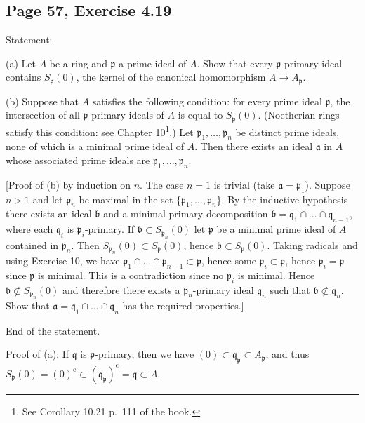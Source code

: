 \documentclass[parskip=half,fontsize=12pt]{scrartcl}%
\newcommand{\oo}{\operatorname}\newcommand{\ooo}{\operatorname*}
\newcommand{\mf}{\mathfrak}
\newcommand{\ppp}{\mf p}
\newcommand{\qqq}{\mf q}
\begin{document}
\subsection{Page 57, Exercise 4.19}%

Statement:

(a) Let $A$ be a ring and $\mathfrak p$ a prime ideal of $A$. Show that every $\mathfrak p$-primary ideal contains $S_{\mathfrak p}(0)$, the kernel of the canonical homomorphism $A\to A_{\mathfrak p}$.

(b) Suppose that $A$ satisfies the following condition: for every prime ideal $\mathfrak p$, the intersection of all $\mathfrak p$-primary ideals of $A$ is equal to $S_{\mathfrak p}(0)$. (Noetherian rings satisfy this condition: see Chapter 10\footnote{See Corollary 10.21 p.~111 of the book.}.) Let $\mathfrak p_1,\dots,\mathfrak p_n$ be distinct prime ideals, none of which is a minimal prime ideal of $A$. Then there exists an ideal $\mathfrak a$ in $A$ whose associated prime ideals are $\mathfrak p_1,\dots,\mathfrak p_n$.

[Proof of (b) by induction on $n$. The case $n=1$ is trivial (take $\mathfrak a=\mathfrak p_1$). Suppose $n>1$ and let $\mathfrak p_n$ be maximal in the set $\{\mathfrak p_1,\dots,\mathfrak p_n\}$. By the inductive hypothesis there exists an ideal $\mathfrak b$ and a minimal primary decomposition $\mathfrak b=\mathfrak q_1\cap\dots\cap\mathfrak q_{n-1}$, where each $\mathfrak q_i$ is $\mathfrak p_i$-primary. If $\mathfrak b\subset S_{\mathfrak p_n}(0)$ let $\mathfrak p$ be a minimal prime ideal of $A$ contained in $\mathfrak p_n$. Then $S_{\mathfrak p_n}(0)\subset S_{\mathfrak p}(0)$, hence $\mathfrak b\subset S_{\mathfrak p}(0)$. Taking radicals and using Exercise 10, we have $\mathfrak p_1\cap\dots\cap\mathfrak p_{n-1}\subset\mathfrak p$, hence some $\mathfrak p_i\subset \mathfrak p$, hence $\mathfrak p_i=\mathfrak p$ since $\mathfrak p$ is minimal. This is a contradiction since no $\mathfrak p_i$ is minimal. Hence $\mathfrak b\not\subset S_{\mathfrak p_n}(0)$ and therefore there exists a $\mathfrak p_n$-primary ideal $\mathfrak q_n$ such that $\mathfrak b\not\subset\mathfrak q_n$. Show that $\mathfrak a=\mathfrak q_1\cap\dots\cap\mathfrak q_n$ has the required properties.]

End of the statement.

Proof of (a): If $\qqq$ is $\ppp$-primary, then we have $(0)\subset\qqq_\ppp\subset A_\ppp$, and thus $S_\ppp(0)=(0)^{\oo c}\subset(\qqq_\ppp)^{\oo c}=\qqq\subset A$. 
\end{document}
